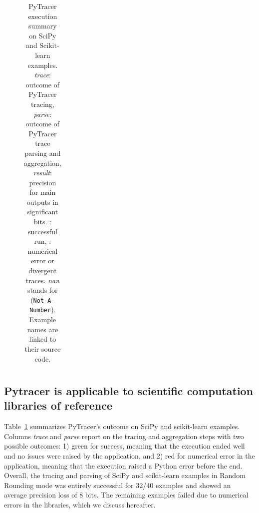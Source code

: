 \documentclass[10pt,journal,compsoc]{IEEEtran}
\newcommand{\cross}[0]{\cellcolor{red!65}\ding{53}}
\newcommand{\valid}[0]{\cellcolor{green!75!black}\ding{51}}
\newcommand{\warn}[0]{\cellcolor{orange!75}?}
\newcommand{\pytracer}[0]{PyTracer\xspace}
\DeclareRobustCommand{\remove}[1]{}
\begin{document}
\begin{table}[]
\begin{subfigure}[t]{\linewidth}
\begin{tabular}{|lll|c|c|c|}
            \hline
        \end{tabular}
    \end{subfigure}
    \caption{\pytracer execution summary on SciPy and Scikit-learn examples.
        \emph{trace}: outcome of \pytracer tracing, \emph{parse}: outcome of
        \pytracer trace parsing and aggregation, \emph{result}: precision for
        main outputs in significant bits. \valid: successful run, \remove{\warn: error
            from invalid noise injection,} \cross: numerical error or divergent
        traces. \textit{nan} stands for (\texttt{Not-A-Number}). Example names
        are linked to their source code.}
    \label{tab:pytracer_results_summary}
\end{table}


\subsection{Pytracer is applicable to scientific computation libraries of reference}

Table~\ref{tab:pytracer_results_summary} summarizes \pytracer's outcome on SciPy
and scikit-learn examples. Columns \textit{trace} and \textit{parse} report on
the tracing and aggregation steps with two possible outcomes: 1) green for
success, meaning that the execution ended well and no issues were raised by the
application, and 2) red for numerical error in the application, meaning that the
execution raised a Python error before the end. \remove{, and 3)
    orange for errors due to the fuzzy noise injection that are
    not considered numerical errors, meaning that the execu-
    tion raised a Python error but due to a perturbation that
    should not have been introduced (i.e. a floating-point value
    representing an integer).}
Overall, the tracing and parsing of SciPy and scikit-learn examples in Random
Rounding mode was entirely successful for 32/40 examples and showed an average
precision loss of 8 bits. The remaining examples failed due to numerical errors
in the libraries, which we discuss hereafter. 
\remove{The instrumentation with Full MCA is
    more invasive and reduced the number of successful exe-
    cutions to 12/40. Among the 28/40 failed executions, one
    failed due to an actual numerical error (Bayesian Ridge
    Regression example) and the other ones failed due to
    perturbations that should not have been introduced.}
\end{document}
